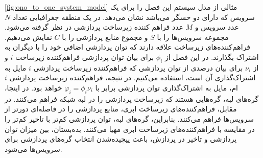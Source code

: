     \cref{fig:ono_to_one_system_model} مثالی از مدل سیستم این فصل را برای یک سرویس که دارای دو حسگر می‌باشد نشان می‌دهد.
    در یک منطقه جغرافیایی تعداد $N$ عدد سرویس و $M$ عدد فراهم کننده زیرساخت پردازشی در نظر گرفته می‌شود.
    مجموعه سرویس‌ها را با $S$ و مجموع منابع پردازشی را با $C$ نمایش می‌دهیم.
    فراهم‌کننده‌های زیرساخت علاقه دارند که توان پردازشی اضافی خود را با دیگران به اشتراک بگذارند.
    در این فصل از $\phi_i$ برای بیان توان پردازشی فراهم‌کننده زیرساخت $i$ و از $\nu_i$ برای بیان درصدی از توان پردازشی که فراهم‌کننده زیرساخت پردازشی $i$ مایل به اشتراک‌گذاری آن است، استفاده می‌کنیم.
    در نتیجه، فراهم‌کننده زیرساخت پردازشی $i$ام، مایل به اشتراک‌گذاری توان پردازشی برابر با $\varphi_i = \phi_i \nu_i$ خواهد بود.
    در اینجا، گره‌های لبه، گره‌هایی هستند که زیرساخت پردازشی را در لبه شبکه فراهم می‌کنند.
    در مقابل، فراهم‌کننده‌های زیرساخت ابری، منابع پردازشی را در فاصله‌ای دورتر از سرویس‌ها فراهم می‌کنند.
    بنابراین،‌ گره‌های لبه، توان پردازشی کم‌تر با تاخیر کم‌تر را در مقایسه با فراهم‌کننده‌های زیرساخت ابری مهیا می‌کنند.
    بده‌بستان، بین میزان توان پردازشی و تاخیر در پردازش، باعث پیچیده‌شدن انتخاب گره‌های پردازشی برای سرویس‌ها می‌شود.
    
